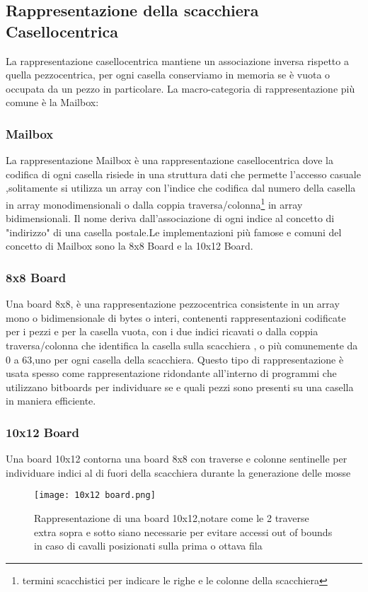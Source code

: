 \subsection{Rappresentazione della scacchiera Casellocentrica}
La rappresentazione casellocentrica  mantiene un associazione inversa rispetto a quella pezzocentrica,
per ogni casella conserviamo in memoria se è vuota o occupata da un pezzo in particolare.
La macro-categoria di  rappresentazione più comune è la Mailbox:

\subsubsection{Mailbox}
La rappresentazione Mailbox è una rappresentazione casellocentrica dove la codifica di ogni casella risiede in una struttura dati
che permette l'accesso casuale ,solitamente si utilizza un array con l'indice che codifica dal numero della casella in array monodimensionali
o dalla coppia traversa/colonna\footnote{termini scacchistici per indicare le righe e le colonne della scacchiera} in array bidimensionali.
Il nome deriva dall'associazione di ogni indice al concetto di "indirizzo" di una casella postale.Le implementazioni più famose e
comuni del concetto di Mailbox sono la 8x8 Board e la 10x12 Board.

\subsubsection{8x8 Board}
Una board 8x8, è una rappresentazione pezzocentrica consistente  in un array mono o bidimensionale di bytes o interi, contenenti rappresentazioni codificate
per i pezzi e per la casella vuota, con i due indici ricavati o dalla coppia traversa/colonna che identifica la casella sulla scacchiera ,
o più comunemente  da 0 a 63,uno per ogni casella della scacchiera.
Questo tipo di rappresentazione è usata spesso come rappresentazione ridondante all'interno di programmi che utilizzano bitboards
per individuare se e quali pezzi sono presenti su una casella in maniera efficiente.

\subsubsection{10x12 Board}
Una board 10x12  contorna una  board 8x8   con traverse e colonne sentinelle  per individuare  indici al di fuori della scacchiera durante la generazione delle mosse
\vfill
\begin{figure}[!ht]
    \centering
    \texttt{[image: 10x12 board.png]}
    \caption{Rappresentazione di una board 10x12,notare come le 2 traverse extra sopra e sotto siano necessarie per evitare accessi out of bounds in caso di cavalli posizionati sulla prima o ottava fila }
\end{figure}



